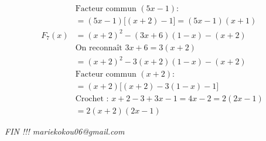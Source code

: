 \documentclass[11pt]{article}
\begin{document}
\[\begin{aligned}
		&\text{Facteur commun } (5x-1) :\\
		&= (5x-1)\big[(x+2)-1\big] = (5x-1)(x+1)\\[6pt]
		F_7(x) &= (x+2)^2-(3x+6)(1-x)-(x+2)\\
		&\text{On reconnaît } 3x+6 = 3(x+2)\\
		&= (x+2)^2-3(x+2)(1-x)-(x+2)\\
		&\text{Facteur commun } (x+2) :\\
		&= (x+2)\big[(x+2)-3(1-x)-1\big]\\
		&\text{Crochet : } x+2-3+3x-1 = 4x-2 = 2(2x-1)\\
		&= 2(x+2)(2x-1)
	\end{aligned}
	\]
	
	\vspace{1cm}
	\hfill \textit{FIN !!! mariekokou06@gmail.com}
	
\end{document}
